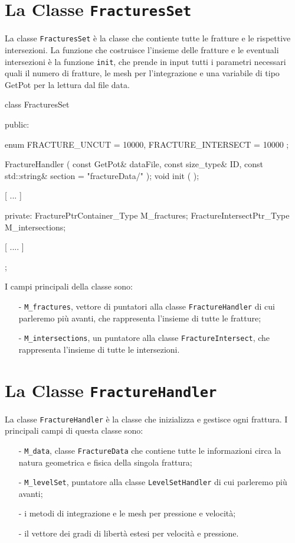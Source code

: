\section{La Classe \texttt{FracturesSet}}
La classe \texttt{FracturesSet} è la classe che contiente tutte le fratture e le rispettive intersezioni. La funzione che costruisce l'insieme delle fratture e le eventuali intersezioni è la funzione  \texttt{init}, che prende in input tutti i parametri necessari quali il numero di fratture, le mesh per l'integrazione e una variabile di tipo GetPot per la lettura dal file data. 

\begin{Code}[caption={Classe \texttt{FracturesSet}}]
class FracturesSet
{
public:

    enum
    {
        FRACTURE_UNCUT = 10000,
        FRACTURE_INTERSECT = 10000
    };

    FractureHandler ( const GetPot& dataFile,
                      const size_type& ID,
                      const std::string& section = "fractureData/" );
    void init ( );

    [ ... ]

private:
	FracturePtrContainer_Type M_fractures;
	FractureIntersectPtr_Type M_intersections;

	[ .... ]
};
\end{Code}
I campi principali della classe sono:
\begin{enumerate}
\item[-] \texttt{M\_fractures}, vettore di puntatori alla classe \texttt{FractureHandler}  di cui parleremo più avanti, che rappresenta l'insieme di tutte le fratture;
\item[-] \texttt{M\_intersections}, un puntatore alla classe \texttt{FractureIntersect}, che rappresenta l'insieme di tutte le intersezioni. 
\end{enumerate}


\section{La Classe \texttt{FractureHandler}}

La classe  \texttt{FractureHandler} è la classe che inizializza e gestisce ogni frattura. I principali campi di questa classe sono:
\begin{enumerate}
\item[-] \texttt{M\_data}, classe \texttt{FractureData} che contiene tutte le informazioni circa la natura geometrica e fisica della singola frattura;
\item[-] \texttt{M\_levelSet}, puntatore alla classe \texttt{LevelSetHandler} di cui parleremo più avanti;
\item[-] i metodi di integrazione e le mesh per pressione e velocità;
\item[-] il vettore dei gradi di libertà estesi per velocità e pressione.
\end{enumerate}

